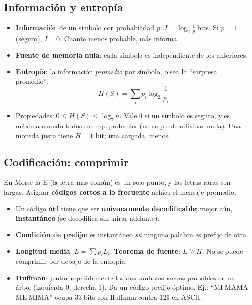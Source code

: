 \documentclass[10pt,a4paper]{article}
\newcommand{\term}[1]{\textbf{\color{azul}#1}}
\begin{document}
\subsection{Información y entropía}
\begin{itemize}
  \item \term{Información} de un símbolo con probabilidad $p$: $I = \log_2 \frac1p$ bits. Si $p=1$ (seguro), $I=0$. Cuanto menos probable, más informa.
  \item \term{Fuente de memoria nula}: cada símbolo es independiente de los anteriores.
  \item \term{Entropía}: la información \emph{promedio} por símbolo, o sea la ``sorpresa promedio'':
        \[ H(S) = \sum_i p_i \log_2 \frac{1}{p_i} \]
  \item Propiedades: $0 \le H(S) \le \log_2 n$. Vale $0$ si un símbolo es seguro, y es máxima cuando todos son equiprobables
        (no se puede adivinar nada). Una moneda justa tiene $H = 1$ bit; una cargada, menos.
\end{itemize}

\subsection{Codificación: comprimir}
\begin{idea}
En Morse la E (la letra más común) es un solo punto, y las letras raras son largas. Asignar
\textbf{códigos cortos a lo frecuente} achica el mensaje promedio.
\end{idea}
\begin{itemize}
  \item Un código útil tiene que ser \term{unívocamente decodificable}; mejor aún, \term{instantáneo} (se decodifica sin mirar adelante).
  \item \term{Condición de prefijo}: es instantáneo \emph{sii} ninguna palabra es prefijo de otra.
  \item \term{Longitud media}: $L = \sum p_i L_i$. \textbf{Teorema de fuente}: $L \ge H$. No se puede comprimir por debajo de la entropía.
  \item \term{Huffman}: juntar repetidamente los dos símbolos menos probables en un árbol (izquierda 0, derecha 1). Da un código prefijo óptimo.
        Ej.: ``MI MAMA ME MIMA'' ocupa 33 bits con Huffman contra 120 en ASCII.
\end{itemize}
\end{document}
